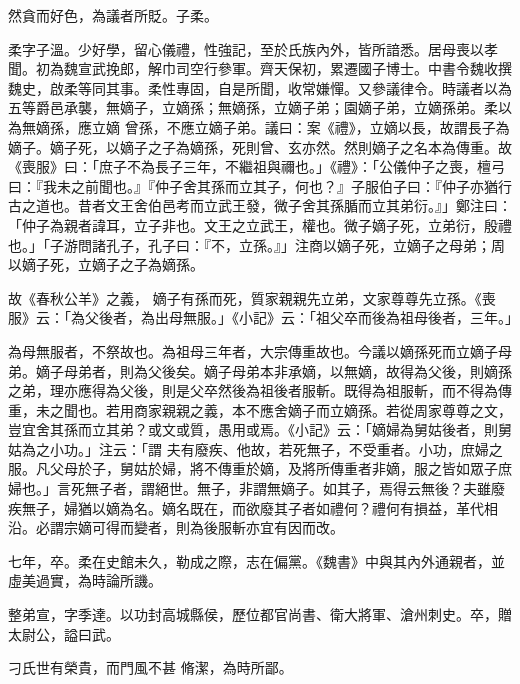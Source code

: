 \begin{pinyinscope}
 然貪而好色，為議者所貶。子柔。



 柔字子溫。少好學，留心儀禮，性強記，至於氏族內外，皆所諳悉。居母喪以孝聞。初為魏宣武挽郎，解巾司空行參軍。齊天保初，累遷國子博士。中書令魏收撰魏史，啟柔等同其事。柔性專固，自是所聞，收常嫌憚。又參議律令。時議者以為五等爵邑承襲，無嫡子，立嫡孫；無嫡孫，立嫡子弟；園嫡子弟，立嫡孫弟。柔以為無嫡孫，應立嫡
 曾孫，不應立嫡子弟。議曰：案《禮》，立嫡以長，故謂長子為嫡子。嫡子死，以嫡子之子為嫡孫，死則曾、玄亦然。然則嫡子之名本為傳重。故《喪服》曰：「庶子不為長子三年，不繼祖與禰也。」《禮》：「公儀仲子之喪，檀弓曰：『我未之前聞也。』『仲子舍其孫而立其子，何也？』子服伯子曰：『仲子亦猶行古之道也。昔者文王舍伯邑考而立武王發，微子舍其孫腯而立其弟衍。』」鄭注曰：「仲子為親者諱耳，立子非也。文王之立武王，權也。微子嫡子死，立弟衍，殷禮也。」「子游問諸孔子，孔子曰：『不，立孫。』」注商以嫡子死，立嫡子之母弟；周以嫡子死，立嫡子之子為嫡孫。



 故《春秋公羊》之義，
 嫡子有孫而死，質家親親先立弟，文家尊尊先立孫。《喪服》云：「為父後者，為出母無服。」《小記》云：「祖父卒而後為祖母後者，三年。」



 為母無服者，不祭故也。為祖母三年者，大宗傳重故也。今議以嫡孫死而立嫡子母弟。嫡子母弟者，則為父後矣。嫡子母弟本非承嫡，以無嫡，故得為父後，則嫡孫之弟，理亦應得為父後，則是父卒然後為祖後者服斬。既得為祖服斬，而不得為傳重，未之聞也。若用商家親親之義，本不應舍嫡子而立嫡孫。若從周家尊尊之文，豈宜舍其孫而立其弟？或文或質，愚用或焉。《小記》云：「嫡婦為舅姑後者，則舅姑為之小功。」注云：「謂
 夫有廢疾、他故，若死無子，不受重者。小功，庶婦之服。凡父母於子，舅姑於婦，將不傳重於嫡，及將所傳重者非嫡，服之皆如眾子庶婦也。」言死無子者，謂絕世。無子，非謂無嫡子。如其子，焉得云無後？夫雖廢疾無子，婦猶以嫡為名。嫡名既在，而欲廢其子者如禮何？禮何有損益，革代相沿。必謂宗嫡可得而變者，則為後服斬亦宜有因而改。



 七年，卒。柔在史館未久，勒成之際，志在偏黨。《魏書》中與其內外通親者，並虛美過實，為時論所譏。



 整弟宣，字季達。以功封高城縣侯，歷位都官尚書、衛大將軍、滄州刺史。卒，贈太尉公，謚曰武。



 刁氏世有榮貴，而門風不甚
 脩潔，為時所鄙。




\end{pinyinscope}
